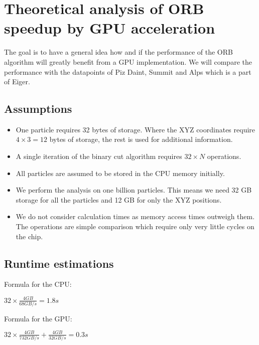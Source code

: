 \documentclass[]{article}
\begin{document}
\section{Theoretical analysis of ORB speedup by GPU acceleration}

The goal is to have a general idea how and if the performance of the ORB algorithm will greatly benefit from a GPU implementation. We will compare the performance with the datapoints of Piz Daint, Summit and Alps which is a part of Eiger. 

\subsection{Assumptions} 
\begin{itemize}
	\item 
	One particle requires 32 bytes of storage. Where the XYZ coordinates require $4\times3 = 12$ bytes of storage, the rest is used for additional information.
	
	\item
	A single iteration of the binary cut algorithm requires $32 \times N$ operations.
	
	\item 
	All particles are assumed to be stored in the CPU memory initially.
	
	\item
	We perform the analysis on one billion particles. This means we need 32 GB storage for all the particles and 12 GB for only the XYZ positions.
	
	\item
	We do not consider calculation times as memory access times  outweigh them. The operations are simple comparison  which require only very little cycles on the chip. 
\end{itemize}

\subsection{Runtime estimations}

Formula for the CPU:
\begin{center}
	$32 \times \frac{ 4 GB}{68 GB/s} = 1.8 s$ 
\end{center}

Formula for the GPU:

\begin{center}
	$32 \times \frac{4 GB}{732 GB/s} + \frac{4 GB}{32 GB/s} = 0.3 s$ 
\end{center}
\end{document}
